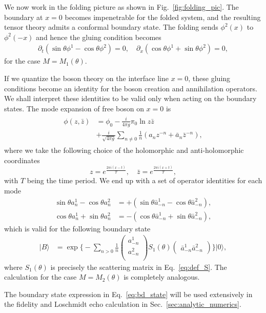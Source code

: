 We now work in the folding picture as shown in Fig.~\ref{fig:folding_pic}. The boundary at $x=0$ becomes impenetrable for the folded system, and the resulting tensor theory admits a conformal boundary state. The folding sends $\phi^2(x)$ to $\phi^2(-x)$ and hence the gluing condition becomes
\begin{equation}
\begin{aligned}
\partial_t(\sin\theta\phi^1-\cos\theta\phi^2)=0, \quad
\partial_x(\cos\theta\phi^1+\sin\theta\phi^2)=0, 
\end{aligned}
\end{equation}
for the case $M = M_1(\theta)$. 

If we quantize the boson theory on the interface line $x = 0$, these gluing conditions become an identity for the boson creation and annihilation operators. We shall interpret these identities to be valid only when acting on the boundary states. The mode expansion of free boson on $x = 0$\cite{di_francesco_conformal_1997} is
\begin{eqnarray}\begin{aligned}
\phi(z, \bar{z} ) &= \phi_0 - \frac{i}{4\pi g } \pi_0 \ln z \bar{z} \\
 \quad&+ \frac{i}{\sqrt{4\pi g} } \sum_{n \ne 0 } \frac{1}{n} \left(a_n z^{-n} + \bar{a}_{n} \bar{z}^{-n}   \right),
\end{aligned}\end{eqnarray}
where we take the following choice of the holomorphic and anti-holomorphic coordinates
\begin{equation}
z= e^{ \frac{2\pi i(x - t)}{T} }, \quad \bar{z} = e^{ \frac{2\pi i( x + t  )}{T} },
\end{equation}
with $T$ being the time period. We end up with a set of operator identities for each mode
\begin{equation}
\begin{aligned}
\label{eq:rotation_a_basis}
\sin  \theta a^1_n - \cos \theta a^2_n  &= + \left( \sin  \theta \bar{a}^1_{-n} - \cos \theta \bar{a}^2_{-n} \right),\\
\cos  \theta a^1_n + \sin \theta a^2_n  &= - \left( \cos  \theta \bar{a}^1_{-n} + \sin \theta \bar{a}^2_{-n} \right), 
\end{aligned}
\end{equation}
which is valid for the following boundary state
\begin{equation}
\label{eq:bd_state}
\begin{aligned}
| B \rangle 
& =  \exp\Big\{ -\sum_{n > 0 } \frac{1}{n}
\begin{pmatrix}
a_{-n}^1\\
a_{-n}^2\\                              
\end{pmatrix}
S_1( \theta )
\begin{pmatrix}
\bar{a}_{-n}^1  \bar{a}_{-n}^2
\end{pmatrix} \Big\} |0\rangle,
\end{aligned}
\end{equation}
where $S_1(\theta) $ is precisely the scattering matrix in Eq.~\eqref{eq:def_S}. The calculation for the case $M=M_2(\theta)$ is completely analogous. 

The boundary state expression in Eq.~\eqref{eq:bd_state} will be used extensively in the fidelity and Loschmidt echo calculation in Sec.~\ref{sec:analytic_numerics}. 

